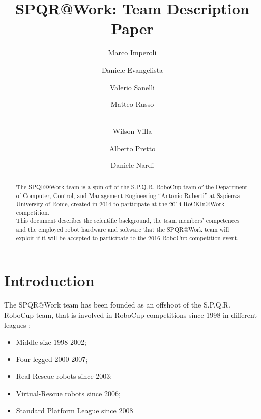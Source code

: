 \documentclass{llncs}
\begin{document}
%
\title{SPQR@Work: Team Description Paper}

\author{Marco Imperoli \and Daniele Evangelista \and Valerio Sanelli \and Matteo Russo\and\\ Wilson Villa \and Alberto Pretto \and Daniele Nardi}


\maketitle

\begin{abstract}
The SPQR@Work team is a spin-off of the S.P.Q.R. RoboCup team of the Department of Computer, Control, and Management Engineering “Antonio Ruberti” at Sapienza University of Rome, created in 2014 to participate at the 2014 RoCKIn@Work competition.\\
This document describes the scientific background, the team members' competences and the employed robot hardware and software that the SPQR@Work team will exploit if it will be accepted to participate to the 2016 RoboCup competition event.
\end{abstract}

\section{Introduction}
The SPQR@Work team has been founded as an offshoot of the S.P.Q.R. RoboCup team, that is involved in RoboCup competitions since 1998 in different leagues :
\begin{itemize}
\item Middle-size 1998-2002;
\item Four-legged 2000-2007;
\item Real-Rescue robots since 2003;
\item Virtual-Rescue robots since 2006;
\item Standard Platform League since 2008
 \end{itemize}
\end{document}
